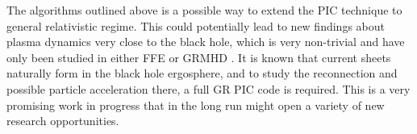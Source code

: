 The algorithms outlined above is a possible way to extend the PIC technique to
general relativistic regime. This could potentially lead to new findings about
plasma dynamics very close to the black hole, which is very non-trivial and have
only been studied in either FFE or GRMHD
\citep[e.g.][]{komissarov_electrodynamics_2004}. It is known that current sheets
naturally form in the black hole ergosphere, and to study the reconnection and
possible particle acceleration there, a full GR PIC code is required. This is a
very promising work in progress that in the long run might open a variety of new
research opportunities.


